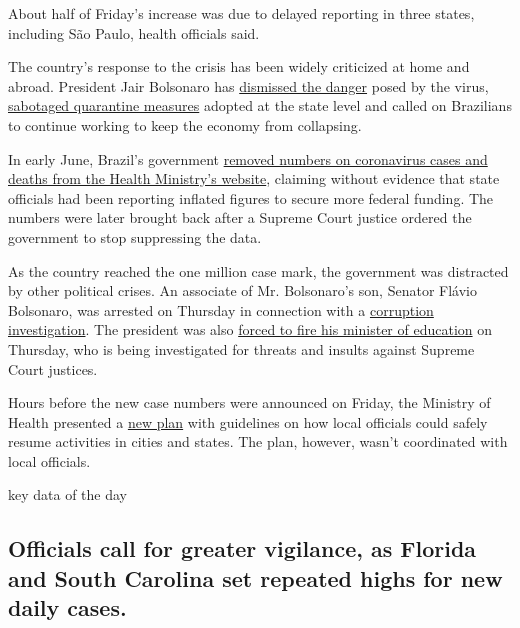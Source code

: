About half of Friday's increase was due to delayed reporting in three
states, including São Paulo, health officials said.

The country's response to the crisis has been widely criticized at home
and abroad. President Jair Bolsonaro has
\href{https://www.nytimes3xbfgragh.onion/2020/04/01/world/americas/brazil-bolsonaro-coronavirus.html}{dismissed
the danger} posed by the virus,
\href{https://www.nytimes3xbfgragh.onion/2020/05/16/world/americas/virus-brazil-deaths.html}{sabotaged
quarantine measures} adopted at the state level and called on Brazilians
to continue working to keep the economy from collapsing.

In early June, Brazil's government
\href{https://www.nytimes3xbfgragh.onion/2020/06/06/world/coronavirus-update-us-usa.html\#link-3cfab740}{removed
numbers on coronavirus cases and deaths from the Health Ministry's
website}, claiming without evidence that state officials had been
reporting inflated figures to secure more federal funding. The numbers
were later brought back after a Supreme Court justice ordered the
government to stop suppressing the data.

As the country reached the one million case mark, the government was
distracted by other political crises. An associate of Mr. Bolsonaro's
son, Senator Flávio Bolsonaro, was arrested on Thursday in connection
with a
\href{https://www.nytimes3xbfgragh.onion/aponline/2020/06/18/world/americas/ap-lt-brazil-corruption-probe.html}{corruption
investigation}. The president was also
\href{https://www.nytimes3xbfgragh.onion/aponline/2020/06/18/world/americas/ap-lt-brazil-cabinet-minister-resigns.html}{forced
to fire his minister of education} on Thursday, who is being
investigated for threats and insults against Supreme Court justices.

Hours before the new case numbers were announced on Friday, the Ministry
of Health presented a
\href{https://www1.folha.uol.com.br/equilibrioesaude/2020/06/ministerio-da-saude-divulga-orientacoes-para-retomada-segura-de-atividades-saiba-quais.shtml?utm_source=twitter\&utm_medium=social\&utm_campaign=twfolha}{new
plan} with guidelines on how local officials could safely resume
activities in cities and states. The plan, however, wasn't coordinated
with local officials.

key data of the day

\hypertarget{officials-call-for-greater-vigilance-as-florida-and-south-carolina-set-repeated-highs-for-new-daily-cases}{%
\subsection{Officials call for greater vigilance, as Florida and South
Carolina set repeated highs for new daily
cases.}\label{officials-call-for-greater-vigilance-as-florida-and-south-carolina-set-repeated-highs-for-new-daily-cases}}

